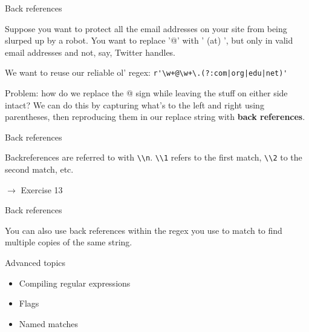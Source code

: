 \documentclass{beamer}
\begin{document}
\begin{frame}{Back references}

Suppose you want to protect all the email addresses
on your site from being slurped up by a robot. You
want to replace '@' with ' (at) ', but only in valid email
addresses and not, say, Twitter handles.

\bigskip

We want to reuse our reliable ol' regex: \lstinline$r'\w+@\w+\.(?:com|org|edu|net)'$

\bigskip

Problem: how do we replace the @ sign while leaving the stuff
on either side intact? We can do this by capturing what's to the left and right using parentheses,
then reproducing them in our replace string with {\bf back references}.

\end{frame}

\begin{frame}{Back references}

Backreferences are referred to with \lstinline$\\n$. \lstinline$\\1$
refers to the first match, \lstinline$\\2$ to the second match, etc.



\bigskip

$\rightarrow$ Exercise 13

\end{frame}

\begin{frame}{Back references}

You can also use back references within the regex you use to match
to find multiple copies of the same string.



\bigskip

\end{frame}

\begin{frame}{Advanced topics}

\begin{itemize}
 \item Compiling regular expressions
 \item Flags
 \item Named matches
\end{itemize}

\end{frame}
\end{document}
